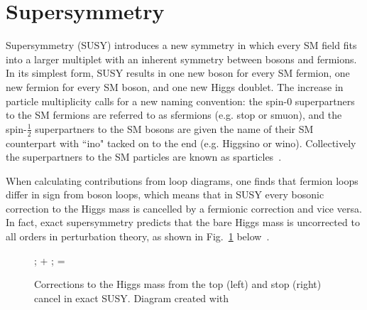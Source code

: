 \documentclass[12pt]{article}
\begin{document}
\section{Supersymmetry}

    Supersymmetry (SUSY) introduces a new symmetry in which every SM field fits into a larger multiplet with an inherent symmetry between bosons and fermions. In its simplest form, SUSY results in one new boson for every SM fermion, one new fermion for every SM boson, and one new Higgs doublet. The increase in particle multiplicity calls for a new naming convention: the spin-0 superpartners to the SM fermions are referred to as sfermions (e.g. stop or smuon), and the spin-$\frac{1}{2}$ superpartners to the SM bosons are given the name of their SM counterpart with ``ino" tacked on to the end (e.g. Higgsino or wino). Collectively the superpartners to the SM particles are known as sparticles~\cite{primer}.

    When calculating contributions from loop diagrams, one finds that fermion loops differ in sign from boson loops, which means that in SUSY every bosonic correction to the Higgs mass is cancelled by a fermionic correction and vice versa. In fact, exact supersymmetry predicts that the bare Higgs mass is uncorrected to all orders in perturbation theory, as shown in Fig.~\ref{exact_susy_correction} below~\cite{primer}.
    
    \noindent \begin{figure}[htbp] \begin{center}
        ;
    \quad + \quad
        ;
        \quad =  \quad
        \caption{Corrections to the Higgs mass from the top (left) and stop (right) cancel in exact SUSY. Diagram created with~\cite{tikz}}
        \label{exact_susy_correction}
    \end{center} \end{figure}
\end{document}
